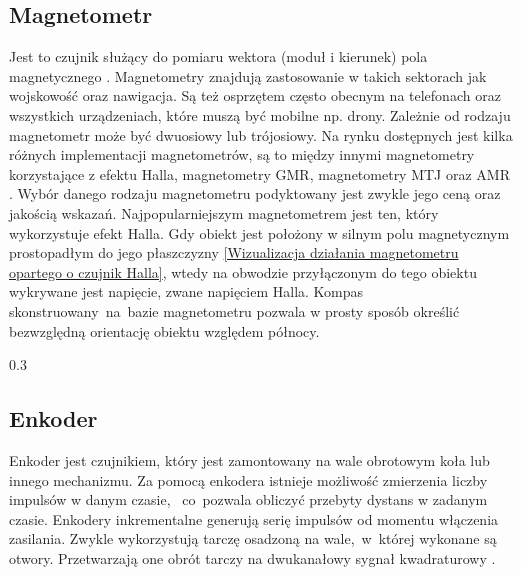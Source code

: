 {    \subsection{Magnetometr}
    {
        Jest to czujnik służący do pomiaru wektora (moduł i kierunek) pola magnetycznego \cite{magnetometer}. Magnetometry znajdują zastosowanie w takich sektorach jak wojskowość oraz nawigacja. Są też osprzętem często obecnym na telefonach oraz wszystkich urządzeniach, które muszą być mobilne np. drony. Zależnie od rodzaju magnetometr może być dwuosiowy lub trójosiowy. Na rynku dostępnych jest kilka różnych implementacji magnetometrów, są to między innymi magnetometry korzystające z efektu Halla, magnetometry GMR, magnetometry MTJ oraz AMR \cite{magneto_work}. Wybór danego rodzaju magnetometru podyktowany jest zwykle jego ceną oraz jakością wskazań. Najpopularniejszym magnetometrem jest ten, który wykorzystuje efekt Halla. Gdy obiekt jest położony w silnym polu magnetycznym prostopadłym do jego płaszczyzny \ref{Wizualizacja działania magnetometru opartego o czujnik Halla}, wtedy na obwodzie przyłączonym do tego obiektu wykrywane jest napięcie, zwane napięciem Halla.
        Kompas skonstruowany~na~bazie magnetometru pozwala w prosty sposób określić bezwzględną orientację obiektu względem północy.

         {0.3}{\cite{mag_work_pic}}
    }
    \subsection{Enkoder}
    {
        Enkoder jest czujnikiem, który jest zamontowany na wale obrotowym koła lub innego mechanizmu. Za pomocą enkodera istnieje możliwość zmierzenia liczby impulsów w danym czasie, ~co~pozwala obliczyć przebyty dystans w zadanym czasie. 
        Enkodery inkrementalne \cite{encoders} generują serię impulsów od momentu włączenia zasilania. Zwykle wykorzystują tarczę osadzoną na wale,~w~której wykonane są otwory. Przetwarzają one obrót tarczy na dwukanałowy sygnał kwadraturowy \cite{encoders}.
    }
}